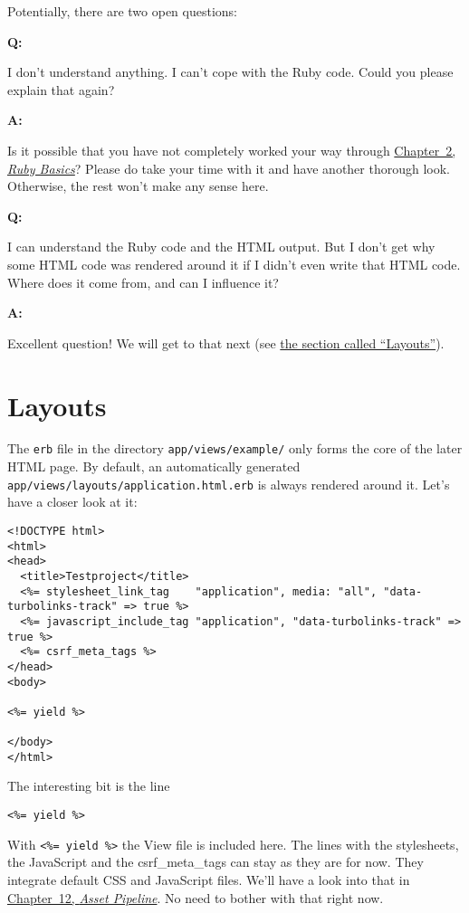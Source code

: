 \documentclass[a4paper]{book}
\newcommand{\chap}[1]{\newpage\thispagestyle{empty}\chapter{#1}\label{chap:\thechapter}}
\begin{document}
Potentially, there are two open questions:

\textbf{Q:}

I don't understand anything. I can't cope with the Ruby code. Could you please explain that again?

\textbf{A:}

Is it possible that you have not completely worked your way through \hyperref[ruby-grundlagen]{Chapter~2, \emph{Ruby Basics}}? Please do take your time with it and have another thorough look. Otherwise, the rest won't make any sense here.

\textbf{Q:}

I can understand the Ruby code and the HTML output. But I don't get why some HTML code was rendered around it if I didn't even write that HTML code. Where does it come from, and can I influence it?

\textbf{A:}

Excellent question! We will get to that next (see \hyperref[erbux5flayouts]{the section called “Layouts”}).

\chap{Layouts}\label{layouts}

The \texttt{erb} file in the directory \texttt{app/views/example/} only forms the core of the later HTML page. By default, an automatically generated \texttt{app/views/layouts/application.html.erb} is always rendered around it. Let's have a closer look at it:

\begin{shaded}\begin{verbatim}
<!DOCTYPE html>
<html>
<head>
  <title>Testproject</title>
  <%= stylesheet_link_tag    "application", media: "all", "data-turbolinks-track" => true %>
  <%= javascript_include_tag "application", "data-turbolinks-track" => true %>
  <%= csrf_meta_tags %>
</head>
<body>

<%= yield %>

</body>
</html>
\end{verbatim}\end{shaded}

The interesting bit is the line

\begin{shaded}\begin{verbatim}
<%= yield %>
\end{verbatim}\end{shaded}

With \texttt{\textless{}\%= yield \%\textgreater{}} the View file is included here. The lines with the stylesheets, the JavaScript and the csrf\_meta\_tags can stay as they are for now. They integrate default CSS and JavaScript files. We'll have a look into that in \hyperref[assetux5fpipeline]{Chapter~12, \emph{Asset Pipeline}}. No need to bother with that right now.
\end{document}
